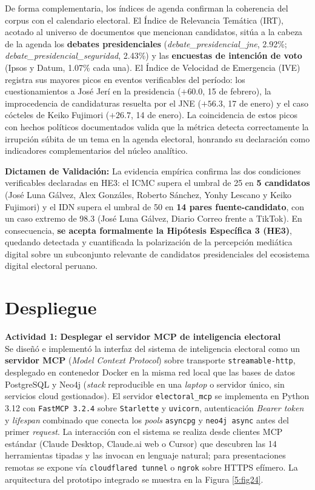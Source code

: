 De forma complementaria, los índices de agenda confirman la coherencia del corpus con el calendario electoral. El Índice de Relevancia Temática (IRT), acotado al universo de documentos que mencionan candidatos, sitúa a la cabeza de la agenda los \textbf{debates presidenciales} (\textit{debate\_presidencial\_jne}, 2.92\%; \textit{debate\_presidencial\_seguridad}, 2.43\%) y las \textbf{encuestas de intención de voto} (Ipsos y Datum, 1.07\% cada una). El Índice de Velocidad de Emergencia (IVE) registra sus mayores picos en eventos verificables del período: los cuestionamientos a José Jerí en la presidencia ($+60.0$, 15 de febrero), la improcedencia de candidaturas resuelta por el JNE ($+56.3$, 17 de enero) y el caso cócteles de Keiko Fujimori ($+26.7$, 14 de enero). La coincidencia de estos picos con hechos políticos documentados valida que la métrica detecta correctamente la irrupción súbita de un tema en la agenda electoral, honrando su declaración como indicadores complementarios del núcleo analítico.

\noindent \textbf{Dictamen de Validación:} La evidencia empírica confirma las dos condiciones verificables declaradas en HE3: el ICMC supera el umbral de 25 en \textbf{5 candidatos} (José Luna Gálvez, Alex Gonzáles, Roberto Sánchez, Yonhy Lescano y Keiko Fujimori) y el IDN supera el umbral de 50 en \textbf{14 pares fuente-candidato}, con un caso extremo de 98.3 (José Luna Gálvez, Diario Correo frente a TikTok). En consecuencia, \textbf{se acepta formalmente la Hipótesis Específica 3 (HE3)}, quedando detectada y cuantificada la polarización de la percepción mediática digital sobre un subconjunto relevante de candidatos presidenciales del ecosistema digital electoral peruano.

\section{Despliegue}

\textbf{Actividad 1: Desplegar el servidor MCP de inteligencia electoral}
\\
Se diseñó e implementó la interfaz del sistema de inteligencia electoral como un
\textbf{servidor MCP} (\textit{Model Context Protocol}) sobre transporte
\texttt{streamable-http}, desplegado en contenedor Docker en la misma red local
que las bases de datos PostgreSQL y Neo4j (\textit{stack} reproducible en una
\textit{laptop} o servidor único, sin servicios cloud gestionados). El servidor
\texttt{electoral\_mcp} se implementa en Python 3.12 con \texttt{FastMCP 3.2.4}
sobre \texttt{Starlette} y \texttt{uvicorn}, autenticación \textit{Bearer token}
y \textit{lifespan} combinado que conecta los \textit{pools} \texttt{asyncpg} y
\texttt{neo4j async} antes del primer \textit{request}. La interacción con el
sistema se realiza desde clientes MCP estándar (Claude Desktop, Claude.ai web o
Cursor) que descubren las 14 herramientas tipadas y las invocan en lenguaje
natural; para presentaciones remotas se expone vía \texttt{cloudflared tunnel} o
\texttt{ngrok} sobre HTTPS efímero. La arquitectura del prototipo integrado se
muestra en la Figura \ref{5:fig24}.

